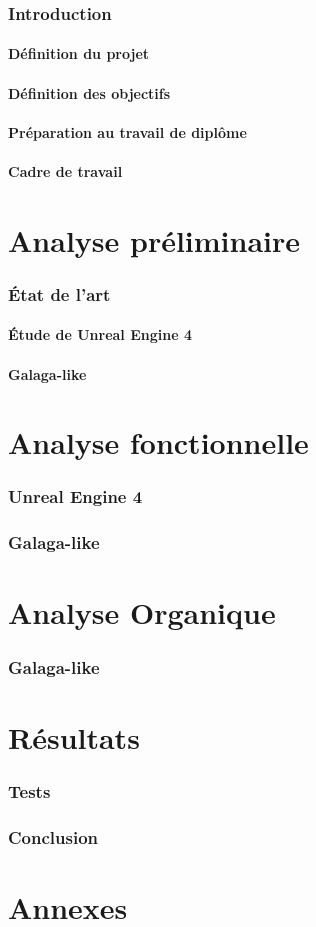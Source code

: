 \documentclass[11pt, a4paper, oneside]{article}
\begin{document}
\section{Introduction}
\subsection{Définition du projet}
\subsection{Définition des objectifs}
\subsection{Préparation au travail de diplôme}
\subsection{Cadre de travail}
\newpage
\part{Analyse préliminaire}
\section{État de l'art}
\subsection{Étude de Unreal Engine 4}
\subsection{Galaga-like}
\newpage
\part{Analyse fonctionnelle}
\section{Unreal Engine 4}
\section{Galaga-like}
\newpage
\part{Analyse Organique}
\section{Galaga-like}
\newpage
\part{Résultats}
\section{Tests}
\section{Conclusion}
\newpage
\part{Annexes}
\end{document}
